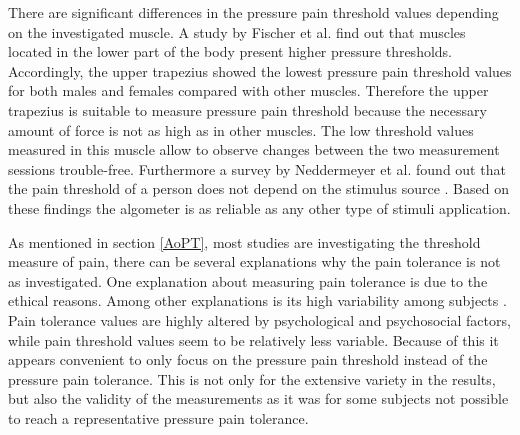 There are significant differences in the pressure pain threshold values depending on the investigated muscle. A study by Fischer et al. \cite{Fischer1987} find out that muscles located in the lower part of the body present higher pressure thresholds. Accordingly, the upper trapezius showed the lowest pressure pain threshold values for both males and females compared with other muscles. Therefore the upper trapezius is suitable to measure pressure pain threshold because the necessary amount of force is not as high as in other muscles. The low threshold values measured in this muscle allow to observe changes between the two measurement sessions trouble-free. Furthermore a survey by Neddermeyer et al. \cite{Neddermeyer2007} found out that the pain threshold of a person does not depend on the stimulus source . Based on these findings the algometer is as reliable as any other type of stimuli application.






As mentioned in section \ref{AoPT}, most studies are investigating the threshold measure of pain, there can be several explanations why the pain tolerance is not as investigated. One explanation about measuring pain tolerance is due to the ethical reasons. Among other explanations is its high variability among subjects \cite{Yarnitsky2006}. Pain tolerance values are highly altered by psychological and psychosocial factors, while pain threshold values seem to be relatively less variable. Because of this it appears convenient to only focus on the pressure pain threshold instead of the pressure pain tolerance. This is not only for the extensive variety in the results, but also the validity of the measurements as it was for some subjects not possible to reach a representative pressure pain tolerance. 


